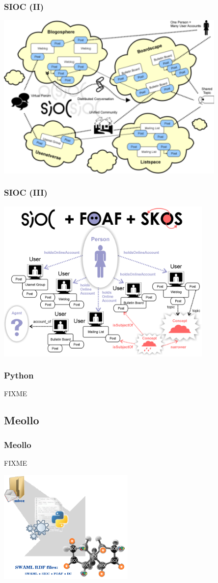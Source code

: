 \documentclass[spanish,notes=hide]{beamer}
\begin{document}
\frame
{
  \frametitle{SIOC (II)}

  \begin{center}
	\includegraphics[width=0.85\textwidth]{images/sioc-discussion.png}
  \end{center}
}
\frame
{
  \frametitle{SIOC (III)}

  \begin{center}
	\includegraphics[width=0.8\textwidth]{images/sioc-foaf-skos.png}
  \end{center}
}
\frame
{
  \frametitle{Python}

  FIXME
}

\subsection{Meollo}
\frame
{
  \frametitle{Meollo}

  FIXME

  \begin{center}
	\includegraphics[width=0.5\textwidth]{images/swaml.png}
  \end{center}
}
\end{document}
